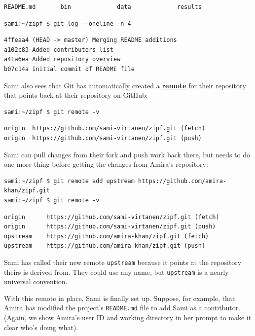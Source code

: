 \documentclass[
]{krantz}
\newcommand{\gref}[2]{\hyperlink{#2}{\textbf{#1}}}
\begin{document}
\begin{verbatim}
README.md       bin             data             results
\end{verbatim}

\begin{verbatim}
sami:~/zipf $ git log --oneline -n 4
\end{verbatim}

\begin{verbatim}
4ffeaa4 (HEAD -> master) Merging README additions
a102c83 Added contributors list
a41a6ea Added repository overview
b07c14a Initial commit of README file
\end{verbatim}

Sami also sees that Git has automatically created a \gref{remote}{git\_remote} for their repository
that points back at their repository on GitHub:

\begin{verbatim}
sami:~/zipf $ git remote -v
\end{verbatim}

\begin{verbatim}
origin  https://github.com/sami-virtanen/zipf.git (fetch)
origin  https://github.com/sami-virtanen/zipf.git (push)
\end{verbatim}

Sami can pull changes from their fork and push work back there,
but needs to do one more thing before getting the changes from Amira's repository:

\begin{verbatim}
sami:~/zipf $ git remote add upstream https://github.com/amira-khan/zipf.git
sami:~/zipf $ git remote -v
\end{verbatim}

\begin{verbatim}
origin      https://github.com/sami-virtanen/zipf.git (fetch)
origin      https://github.com/sami-virtanen/zipf.git (push)
upstream    https://github.com/amira-khan/zipf.git (fetch)
upstream    https://github.com/amira-khan/zipf.git (push)
\end{verbatim}

Sami has called their new remote \texttt{upstream} because it points at the repository
theirs is derived from.
They could use any name,
but \texttt{upstream} is a nearly universal convention.

With this remote in place,
Sami is finally set up.
Suppose,
for example,
that Amira has modified the project's \texttt{README.md} file to add Sami as a contributor.
(Again, we show Amira's user ID and working directory in her prompt to make it clear who's doing what).
\end{document}

